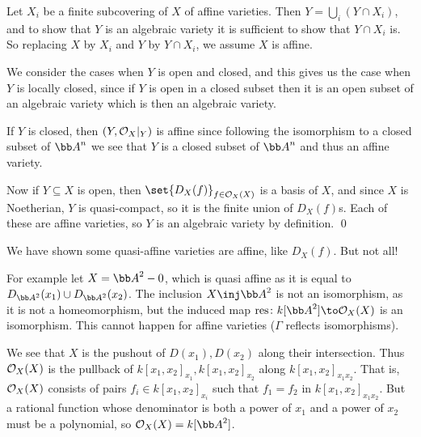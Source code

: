     Let $X_i$ be a finite subcovering of $X$ of affine varieties.
    Then $Y=\bigcup_i(Y\cap X_i)$, and to show that $Y$ is an algebraic variety it is sufficient to show that $Y\cap X_i$ is.
    So replacing $X$ by $X_i$ and $Y$ by $Y\cap X_i$, we assume $X$ is affine.

    We consider the cases when $Y$ is open and closed, and this gives us the case when $Y$ is locally closed, since if $Y$ is open in a closed subset
    then it is an open subset of an algebraic variety which is then an algebraic variety.

    If $Y$ is closed, then $(Y,{{\cal O}}_X|_Y)$ is affine since following the isomorphism to a closed subset of $\bA^n$ we see that $Y$ is a closed subset of $\bA^n$
    and thus an affine variety.

    Now if $Y\subseteq X$ is open, then $\set{D_X(f)}_{f\in\O_X(X)}$ is a basis of $X$, and since $X$ is Noetherian, $Y$ is quasi-compact, so it is the finite
    union of $D_X(f)$s.
    Each of these are affine varieties, so $Y$ is an algebraic variety by definition.
    \qed

\eproof

\bexam

    We have shown some quasi-affine varieties are affine, like $D_X(f)$.
    But not all!

    For example let $X=\bA^2-0$, which is quasi affine as it is equal to $D_{\bA^2}(x_1)\cup D_{\bA^2}(x_2)$.
    The inclusion $X\inj\bA^2$ is not an isomorphism, as it is not a homeomorphism, but the induced map $\res\colon k[\bA^2]\to\O_X(X)$ is an isomorphism.
    This cannot happen for affine varieties ($\Gamma$ reflects isomorphisms).

    We see that $X$ is the pushout of $D(x_1),D(x_2)$ along their intersection.
    Thus ${{\cal O}}_X(X)$ is the pullback of $k[x_1,x_2]_{x_1},k[x_1,x_2]_{x_2}$ along $k[x_1,x_2]_{x_1x_2}$.
    That is, ${{\cal O}}_X(X)$ consists of pairs $f_i\in k[x_1,x_2]_{x_i}$ such that $f_1=f_2$ in $k[x_1,x_2]_{x_1x_2}$.
    But a rational function whose denominator is both a power of $x_1$ and a power of $x_2$ must be a polynomial, so $\O_X(X)=k[\bA^2]$.

\eexam

